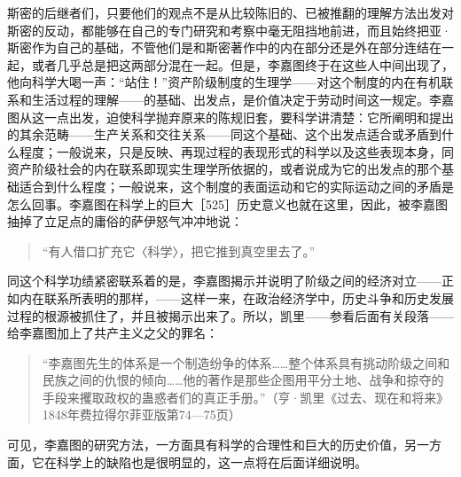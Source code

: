 斯密的后继者们，只要他们的观点不是从比较陈旧的、已被推翻的理解方法出发对斯密的反动，都能够在自己的专门研究和考察中毫无阻挡地前进，而且始终把亚·斯密作为自己的基础，不管他们是和斯密著作中的内在部分还是外在部分连结在一起，或者几乎总是把这两部分混在一起。但是，李嘉图终于在这些人中间出现了，他向科学大喝一声：“站住！”资产阶级制度的生理学——对这个制度的内在有机联系和生活过程的理解——的基础、出发点，是价值决定于劳动时间这一规定。李嘉图从这一点出发，迫使科学抛弃原来的陈规旧套，要科学讲清楚：它所阐明和提出的其余范畴——生产关系和交往关系——同这个基础、这个出发点适合或矛盾到什么程度；一般说来，只是反映、再现过程的表现形式的科学以及这些表现本身，同资产阶级社会的内在联系即现实生理学所依据的，或者说成为它的出发点的那个基础适合到什么程度；一般说来，这个制度的表面运动和它的实际运动之间的矛盾是怎么回事。李嘉图在科学上的巨大［525］历史意义也就在这里，因此，被李嘉图抽掉了立足点的庸俗的萨伊怒气冲冲地说：

\begin{quote}{“有人借口扩充它〈科学〉，把它推到真空里去了。”}\end{quote}

同这个科学功绩紧密联系着的是，李嘉图揭示并说明了阶级之间的经济对立——正如内在联系所表明的那样，——这样一来，在政治经济学中，历史斗争和历史发展过程的根源被抓住了，并且被揭示出来了。所以，凯里——参看后面有关段落——给李嘉图加上了共产主义之父的罪名：

\begin{quote}{“李嘉图先生的体系是一个制造纷争的体系……整个体系具有挑动阶级之间和民族之间的仇恨的倾向……他的著作是那些企图用平分土地、战争和掠夺的手段来攫取政权的蛊惑者们的真正手册。”（亨·凯里《过去、现在和将来》1848年费拉得尔菲亚版第74—75页）}\end{quote}

可见，李嘉图的研究方法，一方面具有科学的合理性和巨大的历史价值，另一方面，它在科学上的缺陷也是很明显的，这一点将在后面详细说明。


